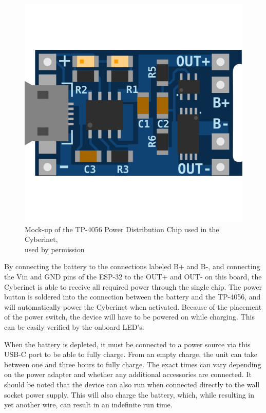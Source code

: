 \begin{center}
    \begin{figure}
        \centering
        \includegraphics[scale=0.3]{diagrams/1554633962.png}
        \caption{Mock-up of the TP-4056 Power Distribution Chip used in the Cyberinet,\\used by permission}
        \label{fig:tp5046} %
    \end{figure}
\end{center}

By connecting the battery to the connections labeled B+ and B-, and connecting the Vin and GND pins of the ESP-32 to the OUT+ and OUT- on this board, the Cyberinet is able to receive all required power through the single chip. The power button is soldered into the connection between the battery and the TP-4056, and will automatically power the Cyberinet when activated. Because of the placement of the power switch, the device will have to be powered on while charging. This can be easily verified by the onboard LED's. 

When the battery is depleted, it must be connected to a power source via this USB-C port to be able to fully charge. From an empty charge, the unit can take between one and three hours to fully charge. The exact times can vary depending on the power adapter and whether any additional accessories are connected. It should be noted that the device can also run when connected directly to the wall socket power supply. This will also charge the battery, which, while resulting in yet another wire, can result in an indefinite run time.

